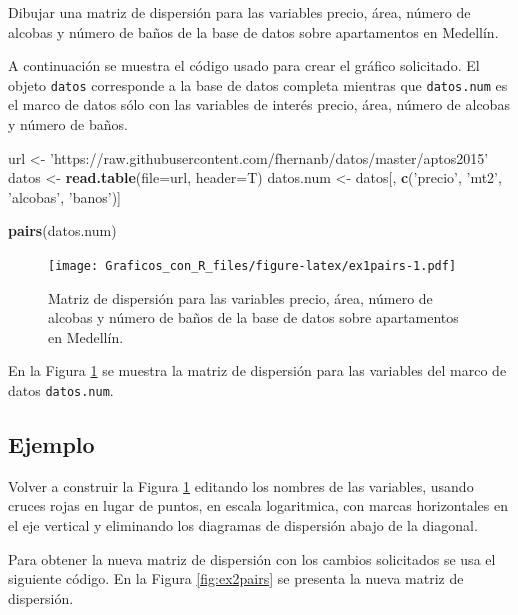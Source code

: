 \documentclass[10pt,]{krantz}
\makeatletter
\newenvironment{Shaded}{\begin{snugshade}}{\end{snugshade}}
\newcommand{\KeywordTok}[1]{\textcolor[rgb]{0.13,0.29,0.53}{\textbf{{#1}}}}
\newcommand{\DataTypeTok}[1]{\textcolor[rgb]{0.13,0.29,0.53}{{#1}}}
\newcommand{\StringTok}[1]{\textcolor[rgb]{0.31,0.60,0.02}{{#1}}}
\newcommand{\NormalTok}[1]{{#1}}
\newenvironment{kframe}{%
\medskip{}
\setlength{\fboxsep}{.8em}
 \def\at@end@of@kframe{}%
 \ifinner\ifhmode%
  \def\at@end@of@kframe{\end{minipage}}%
  \begin{minipage}{\columnwidth}%
 \fi\fi%
 \def\FrameCommand##1{\hskip\@totalleftmargin \hskip-\fboxsep
 \colorbox{shadecolor}{##1}\hskip-\fboxsep
     \hskip-\linewidth \hskip-\@totalleftmargin \hskip\columnwidth}%
 \MakeFramed {\advance\hsize-\width
   \@totalleftmargin\z@ \linewidth\hsize
   \@setminipage}}%
 {\par\unskip\endMakeFramed%
 \at@end@of@kframe}
\renewenvironment{Shaded}{\begin{kframe}}{\end{kframe}}
\makeatother
\begin{document}
Dibujar una matriz de dispersión para las variables precio, área, número
de alcobas y número de baños de la base de datos sobre apartamentos en
Medellín.

A continuación se muestra el código usado para crear el gráfico
solicitado. El objeto \texttt{datos} corresponde a la base de datos
completa mientras que \texttt{datos.num} es el marco de datos sólo con
las variables de interés precio, área, número de alcobas y número de
baños.

\begin{Shaded}
\begin{Highlighting}[]
\NormalTok{url <-}\StringTok{ 'https://raw.githubusercontent.com/fhernanb/datos/master/aptos2015'}
\NormalTok{datos <-}\StringTok{ }\KeywordTok{read.table}\NormalTok{(}\DataTypeTok{file=}\NormalTok{url, }\DataTypeTok{header=}\NormalTok{T)}
\NormalTok{datos.num <-}\StringTok{ }\NormalTok{datos[, }\KeywordTok{c}\NormalTok{(}\StringTok{'precio'}\NormalTok{, }\StringTok{'mt2'}\NormalTok{, }\StringTok{'alcobas'}\NormalTok{, }\StringTok{'banos'}\NormalTok{)]}

\KeywordTok{pairs}\NormalTok{(datos.num)}
\end{Highlighting}
\end{Shaded}

\begin{figure}[htbp]
\centering
\texttt{[image: Graficos\_con\_R\_files/figure-latex/ex1pairs-1.pdf]}
\caption{\label{fig:ex1pairs}Matriz de dispersión para las variables precio,
área, número de alcobas y número de baños de la base de datos sobre
apartamentos en Medellín.}
\end{figure}

En la Figura \ref{fig:ex1pairs} se muestra la matriz de dispersión para
las variables del marco de datos \texttt{datos.num}.

\subsection*{Ejemplo}\label{ejemplo-11}


Volver a construir la Figura \ref{fig:ex1pairs} editando los nombres de
las variables, usando cruces rojas en lugar de puntos, en escala
logaritmica, con marcas horizontales en el eje vertical y eliminando los
diagramas de dispersión abajo de la diagonal.

Para obtener la nueva matriz de dispersión con los cambios solicitados
se usa el siguiente código. En la Figura \ref{fig:ex2pairs} se presenta
la nueva matriz de dispersión.
\end{document}
